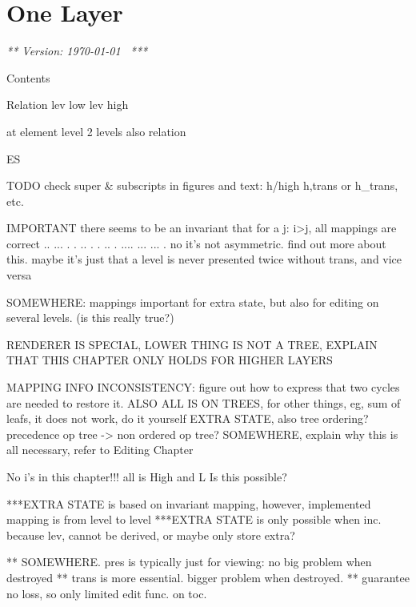 \chapter{One Layer}
\label{chap:singleLayer}
\newcommand{\iup}[0]{\text{\textuparrow}}
\newcommand{\idwn}[0]{\text{\textdownarrow}}

{\em *** Version: \today~ ***}
\bc



Contents


Relation
lev low lev high

at element level 2 levels also relation

ES






TODO
check super & subscripts in figures and text: h/high h,trans or h_trans, etc.


IMPORTANT there seems to be an invariant that for a j:  i>j, all mappings are correct 
  ..           ...       
 .  .    ..   .   .   .. 
.    ....  ...     ...  .
 no it's not asymmetric. find out more about this.
 maybe it's just that a level is never presented twice without trans, and vice versa


SOMEWHERE: mappings important for extra state, but also for editing on several levels. (is this really true?)

RENDERER IS SPECIAL, LOWER THING IS NOT A TREE, EXPLAIN THAT THIS CHAPTER ONLY HOLDS FOR HIGHER LAYERS

MAPPING INFO INCONSISTENCY: figure out how to express that two cycles are needed to restore it.
ALSO ALL IS ON TREES, for other things, eg, sum of leafs, it does not work, do it yourself
EXTRA STATE, also tree ordering? precedence op tree -> non ordered op tree?
SOMEWHERE, explain why this is all necessary, refer to Editing Chapter

No i's in this chapter!!! all is High and L Is this possible?

***EXTRA STATE is based on invariant mapping, however, implemented mapping is from level to level
***EXTRA STATE is only possible when inc. because lev, cannot be derived, or maybe only store extra?

** SOMEWHERE. pres is typically just for viewing: no big problem when destroyed
** trans is more essential. bigger problem when destroyed.
** guarantee no loss, so only limited edit func. on toc.

